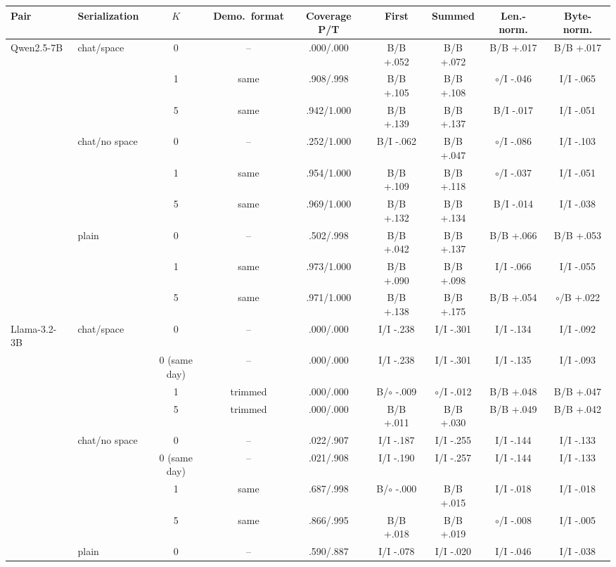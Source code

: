 \begin{table}[t]
\centering\scriptsize
\setlength{\tabcolsep}{3pt}
\begin{tabular}{@{}llccccccc@{}}
\toprule
Pair & Serialization & $K$ & Demo.\ format & Coverage P/T & First & Summed & Len.-norm. & Byte-norm. \\
\midrule
Qwen2.5-7B & chat/space & 0 & -- & .000/.000 & B/B +.052 & B/B +.072 & B/B +.017 & B/B +.017 \\
 &  & 1 & same & .908/.998 & B/B +.105 & B/B +.108 & $\circ$/I -.046 & I/I -.065 \\
 &  & 5 & same & .942/1.000 & B/B +.139 & B/B +.137 & B/I -.017 & I/I -.051 \\
\addlinespace[1pt]
 & chat/no space & 0 & -- & .252/1.000 & B/I -.062 & B/B +.047 & $\circ$/I -.086 & I/I -.103 \\
 &  & 1 & same & .954/1.000 & B/B +.109 & B/B +.118 & $\circ$/I -.037 & I/I -.051 \\
 &  & 5 & same & .969/1.000 & B/B +.132 & B/B +.134 & B/I -.014 & I/I -.038 \\
\addlinespace[1pt]
 & plain & 0 & -- & .502/.998 & B/B +.042 & B/B +.137 & B/B +.066 & B/B +.053 \\
 &  & 1 & same & .973/1.000 & B/B +.090 & B/B +.098 & I/I -.066 & I/I -.055 \\
 &  & 5 & same & .971/1.000 & B/B +.138 & B/B +.175 & B/B +.054 & $\circ$/B +.022 \\
\addlinespace[1pt]
Llama-3.2-3B & chat/space & 0 & -- & .000/.000 & I/I -.238 & I/I -.301 & I/I -.134 & I/I -.092 \\
 &  & 0 (same day) & -- & .000/.000 & I/I -.238 & I/I -.301 & I/I -.135 & I/I -.093 \\
 &  & 1 & trimmed & .000/.000 & B/$\circ$ -.009 & $\circ$/I -.012 & B/B +.048 & B/B +.047 \\
 &  & 5 & trimmed & .000/.000 & B/B +.011 & B/B +.030 & B/B +.049 & B/B +.042 \\
\addlinespace[1pt]
 & chat/no space & 0 & -- & .022/.907 & I/I -.187 & I/I -.255 & I/I -.144 & I/I -.133 \\
 &  & 0 (same day) & -- & .021/.908 & I/I -.190 & I/I -.257 & I/I -.144 & I/I -.133 \\
 &  & 1 & same & .687/.998 & B/$\circ$ -.000 & B/B +.015 & I/I -.018 & I/I -.018 \\
 &  & 5 & same & .866/.995 & B/B +.018 & B/B +.019 & $\circ$/I -.008 & I/I -.005 \\
\addlinespace[1pt]
 & plain & 0 & -- & .590/.887 & I/I -.078 & I/I -.020 & I/I -.046 & I/I -.038 \\

\end{tabular}
\end{table}
